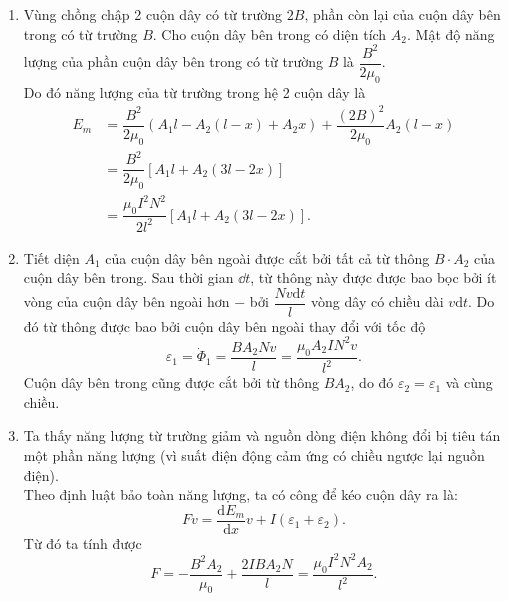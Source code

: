 \begin{loigiai}
    \begin{enumerate}[1)]
        \item Vùng chồng chập 2 cuộn dây có từ trường $2B$, phần còn lại của cuộn dây bên trong có từ trường $B$. Cho cuộn dây bên trong có diện tích $A_2$. Mật độ năng lượng của phần cuộn dây bên trong có từ trường $B$ là $\dfrac{B^2}{2 \mu_0}$. 
    \\Do đó năng lượng của từ trường trong hệ 2 cuộn dây là
    \[\begin{aligned}
            E_m &=\dfrac{B^2}{2\mu_0}\left(A_1l-A_2(l-x)+A_2x \right)+\dfrac{(2B)^2}{2\mu_0}A_2(l-x) \\
            &=\dfrac{B^2}{2\mu_0}\left[ A_1l+A_2(3l-2x)\right]\\
               &=\dfrac{\mu_0 I^2 N^2}{2l^2}\left[A_1l+A_2(3l-2x)\right].
    \end{aligned}\]
    \item Tiết diện $A_1$ của cuộn dây bên ngoài được cắt bởi tất cả từ thông $ B\cdot A_2$ của cuộn dây bên trong. Sau thời gian $\dd t$, từ thông này được được bao bọc bởi ít vòng của cuộn dây bên ngoài hơn $-$ bởi $\dfrac{Nv \mathrm{d}t}{l}$ vòng dây có chiều dài $v \mathrm{d}t$. Do đó từ thông được bao bởi cuộn dây bên ngoài thay đổi với tốc độ 
    \[\varepsilon_1 = \dot \Phi_1=\dfrac{BA_2Nv}{l}=\dfrac{\mu_0A_2IN^2v}{l^2}.\]
    Cuộn dây bên trong cũng được cắt bởi từ thông $BA_2$, do đó $\varepsilon_2=\varepsilon_1$ và cùng chiều.
    \item Ta thấy năng lượng từ trường giảm và nguồn dòng điện không đổi bị tiêu tán một phần năng lượng (vì suất điện động cảm ứng có chiều ngược lại nguồn điện).
    \\ Theo định luật bảo toàn năng lượng, ta có công để kéo cuộn dây ra là:
    \[Fv=\dfrac{\mathrm{d}E_m}{\mathrm{d}x}v+I(\varepsilon_1+\varepsilon_2).\]
    Từ đó ta tính được 
    \[F=-\dfrac{B^2A_2}{\mu_0}+\dfrac{2IBA_2N}{l}=\dfrac{\mu_0I^2N^2A_2}{l^2}.\]
    \end{enumerate}
\end{loigiai}

